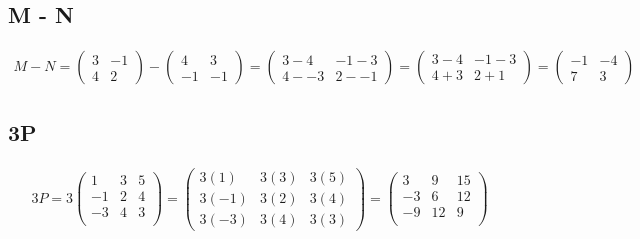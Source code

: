 \documentclass[a4paper,10pt]{article}
\begin{document}
    \subsection{M - N}
      \begin{align*}
        M - N =
        \begin{pmatrix}
          3 & -1\\
          4 &  2
        \end{pmatrix}
        -
        \begin{pmatrix}
           4 & 3\\
          -1 & -1
        \end{pmatrix}
        =
        \begin{pmatrix}
          3 - 4 & -1 - 3\\
          4 - -3 & 2 - -1
        \end{pmatrix}
        =
        \begin{pmatrix}
          3 - 4 & -1 - 3\\
          4 + 3 & 2 + 1
        \end{pmatrix}
        =
        \begin{pmatrix}
          -1 & -4\\
          7 & 3
        \end{pmatrix}
      \end{align*}

    \subsection{3P}
      \begin{align*}
        3P =
        3
        \begin{pmatrix}
          1 & 3 & 5\\
          -1 & 2 & 4\\
          -3 & 4 & 3\\
        \end{pmatrix}
        =
        \begin{pmatrix}
          3(1) & 3(3) & 3(5)\\
          3(-1) & 3(2) & 3(4)\\
          3(-3) & 3(4) & 3(3)
        \end{pmatrix}
        =
        \begin{pmatrix}
          3 & 9 & 15\\
          -3 & 6 & 12\\
          -9 & 12 & 9\\
        \end{pmatrix}
      \end{align*}
\end{document}
